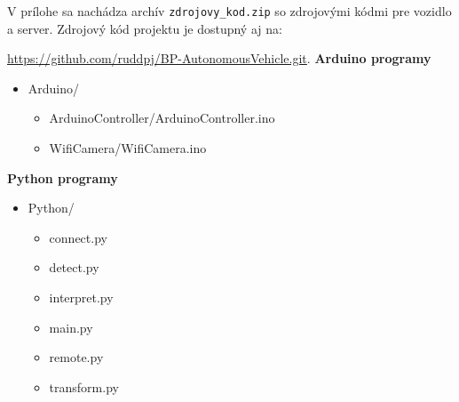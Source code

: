 V prílohe sa nachádza archív \verb|zdrojovy_kod.zip| so zdrojovými kódmi pre vozidlo a server.
Zdrojový kód projektu je dostupný aj na:\par
\url{https://github.com/ruddpj/BP-AutonomousVehicle.git}.
\vspace*{50px}
\newline
\textbf{Arduino programy}
\begin{itemize}
	\item Arduino/
		\begin{itemize}
			\item ArduinoController/ArduinoController.ino
			\item WifiCamera/WifiCamera.ino
		\end{itemize}
\end{itemize}
\textbf{Python programy}
\begin{itemize}
	\item Python/
		\begin{itemize}
			\item connect.py
			\item detect.py
			\item interpret.py
			\item main.py
			\item remote.py
			\item transform.py
		\end{itemize}
\end{itemize}
